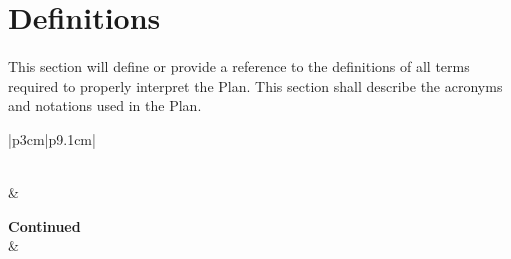 \documentclass[11pt,a4paper]{article}
\begin{document}
    \section{Definitions}
    \paragraph{} This section will define or provide a reference to the definitions of all terms required to properly interpret the Plan. This section shall describe the acronyms and notations used in the Plan.
    \begin{center}
        \begin{longtable}{|p{3cm}|p{9.1cm}|}
            \caption[Definitions]{Definitions, Acronyms \& Abbreviations} \label{grid:abbv} \\
            \hline
             & \\
            \hline
            \endfirsthead

            {\textbf{Continued}} \\
            \hline
             &  \\
            \hline
            \endhead

            \endfoot


\end{longtable}
\end{center}
\end{document}
